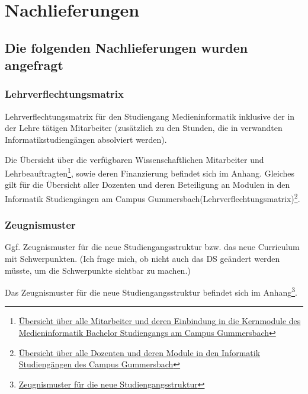 \chapter{Nachlieferungen\label{/mi-2017/selbstbericht/stellungnahme/0100-nachlieferungen}}\label{nachlieferungenpathlabelmi-2017selbstberichtstellungnahme0100-nachlieferungen}

\section{Die folgenden Nachlieferungen wurden
angefragt\label{/mi-2017/selbstbericht/stellungnahme/0100-nachlieferungen}}\label{die-folgenden-nachlieferungen-wurden-angefragtpathlabelmi-2017selbstberichtstellungnahme0100-nachlieferungen}

\subsection{Lehrverflechtungsmatrix\label{/mi-2017/selbstbericht/stellungnahme/0100-nachlieferungen}}\label{lehrverflechtungsmatrixpathlabelmi-2017selbstberichtstellungnahme0100-nachlieferungen}

\begin{siderules}
Lehrverflechtungsmatrix für den Studiengang Medieninformatik inklusive
der in der Lehre tätigen Mitarbeiter (zusätzlich zu den Stunden, die in
verwandten Informatikstudiengängen absolviert werden).
\end{siderules}

Die Übersicht über die verfügbaren Wissenschaftlichen Mitarbeiter und
Lehrbeauftragten\footnote{\href{https://th-koeln.github.io/mi-2017/anhaenge/stellungsnahme/mitarbeiter-und-module-mi-kern-2017.pdf}{Übersicht
  über alle Mitarbeiter und deren Einbindung in die Kernmodule des
  Medieninformatik Bachelor Studiengangs am Campus Gummersbach}}, sowie
deren Finanzierung befindet sich im Anhang. Gleiches gilt für die
Übersicht aller Dozenten und deren Beteiligung an Modulen in den
Informatik Studiengängen am Campus
Gummersbach(Lehrverflechtungsmatrix)\footnote{\href{https://th-koeln.github.io/mi-2017/anhaenge/stellungsnahme/dozenten-und-module-2017.pdf}{Übersicht
  über alle Dozenten und deren Module in den Informatik Studiengängen
  des Campus Gummersbach}}.

\subsection{Zeugnismuster\label{/mi-2017/selbstbericht/stellungnahme/0100-nachlieferungen}}\label{zeugnismusterpathlabelmi-2017selbstberichtstellungnahme0100-nachlieferungen}

\begin{siderules}
Ggf. Zeugnismuster für die neue Studiengangsstruktur bzw. das neue
Curriculum mit Schwerpunkten. (Ich frage mich, ob nicht auch das DS
geändert werden müsste, um die Schwerpunkte sichtbar zu machen.)
\end{siderules}

Das Zeugnismuster für die neue Studiengangsstruktur befindet sich im
Anhang\footnote{\href{https://th-koeln.github.io/mi-2017/anhaenge/stellungsnahme/Urkunde_Zeugnis_Entwurf_black.pdf}{Zeugnismuster
  für die neue Studiengangsstruktur}}.
